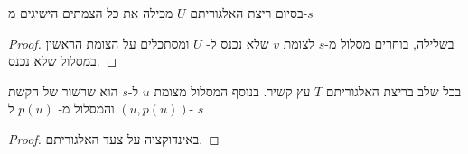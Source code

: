 \begin{claim}
בסיום ריצת האלגוריתם
$U$
מכילה את כל הצמתים הישיגים מ-$s$
\end{claim}
\begin{proof}
בשלילה, בוחרים מסלול מ-$s$ לצומת $v$ שלא נכנס ל-%
$U$
ומסתכלים על הצומת הראשון במסלול שלא נכנס.
\end{proof}

\begin{claim}
בכל שלב בריצת האלגוריתם
$T$
עץ קשיר.
בנוסף המסלול מצומת $u$ ל-$s$ הוא שרשור של הקשת 
$(u, p(u))$
והמסלול מ-%
$p(u)$
ל-%
$s$
\end{claim}

\begin{proof}
באינדוקציה על צעד האלגוריתם.
\end{proof}

